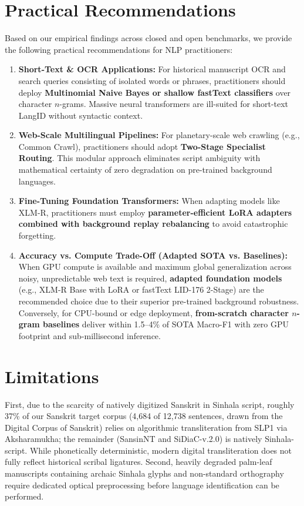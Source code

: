 \documentclass[11pt]{article}
\begin{document}
\section{Practical Recommendations}
Based on our empirical findings across closed and open benchmarks, we provide the following practical recommendations for NLP practitioners:
\begin{enumerate}
    \item \textbf{Short-Text \& OCR Applications:} For historical manuscript OCR and search queries consisting of isolated words or phrases, practitioners should deploy \textbf{Multinomial Naive Bayes or shallow fastText classifiers} over character $n$-grams. Massive neural transformers are ill-suited for short-text LangID without syntactic context.
    \item \textbf{Web-Scale Multilingual Pipelines:} For planetary-scale web crawling (e.g., Common Crawl), practitioners should adopt \textbf{Two-Stage Specialist Routing}. This modular approach eliminates script ambiguity with mathematical certainty of zero degradation on pre-trained background languages.
    \item \textbf{Fine-Tuning Foundation Transformers:} When adapting models like XLM-R, practitioners must employ \textbf{parameter-efficient LoRA adapters combined with background replay rebalancing} to avoid catastrophic forgetting.
    \item \textbf{Accuracy vs. Compute Trade-Off (Adapted SOTA vs. Baselines):} When GPU compute is available and maximum global generalization across noisy, unpredictable web text is required, \textbf{adapted foundation models} (e.g., XLM-R Base with LoRA or fastText LID-176 2-Stage) are the recommended choice due to their superior pre-trained background robustness. Conversely, for CPU-bound or edge deployment, \textbf{from-scratch character $n$-gram baselines} deliver within 1.5--4\% of SOTA Macro-F1 with zero GPU footprint and sub-millisecond inference.
\end{enumerate}

\section{Limitations}
First, due to the scarcity of natively digitized Sanskrit in Sinhala script, roughly 37\% of our Sanskrit target corpus (4,684 of 12,738 sentences, drawn from the Digital Corpus of Sanskrit) relies on algorithmic transliteration from SLP1 via Aksharamukha; the remainder (SansinNT and SiDiaC-v.2.0) is natively Sinhala-script. While phonetically deterministic, modern digital transliteration does not fully reflect historical scribal ligatures. Second, heavily degraded palm-leaf manuscripts containing archaic Sinhala glyphs and non-standard orthography require dedicated optical preprocessing before language identification can be performed.
\end{document}
